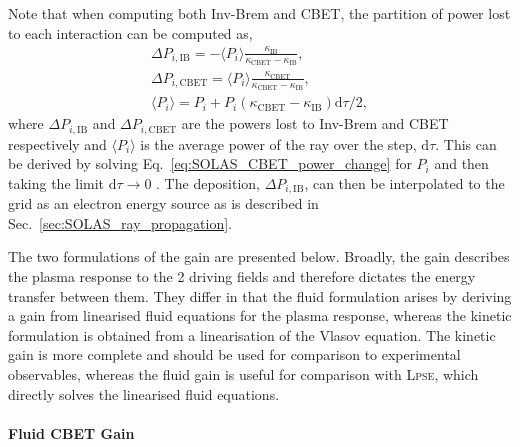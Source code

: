 Note that when computing both \ac{Inv-Brem} and \ac{CBET}, the partition of power lost to each interaction can be computed as,
\begin{equation}
    \label{eq:CBET_deposition}
    \begin{gathered}
        \Delta P_{i,\text{IB}} = - \langle P_i\rangle \frac{\kappa_{\text{IB}}}{\kappa_{\text{CBET}} - \kappa_{\text{IB}}}, \\
        \Delta P_{i,\text{CBET}} = \langle P_i\rangle \frac{\kappa_{\text{CBET}}}{\kappa_{\text{CBET}} - \kappa_{\text{IB}}}, \\
        \langle P_i\rangle = P_i  + P_i\left( \kappa_{\text{CBET}} - \kappa_{\text{IB}} \right)\text{d}\tau/2,
    \end{gathered}
\end{equation}
where $\Delta P_{i,\text{IB}}$ and $\Delta P_{i,\text{CBET}}$ are the powers lost to \ac{Inv-Brem} and \ac{CBET} respectively and $\langle P_i\rangle$ is the average power of the ray over the step, $\text{d}\tau$.
This can be derived by solving Eq.~\ref{eq:SOLAS_CBET_power_change} for $P_i$ and then taking the limit $\text{d}\tau\rightarrow0$ \cite{marozas_wavelength-detuning_2018}.
The deposition, $\Delta P_{i,\text{IB}}$, can then be interpolated to the grid as an electron energy source as is described in Sec.~\ref{sec:SOLAS_ray_propagation}.

The two formulations of the gain are presented below.
Broadly, the gain describes the plasma response to the 2 driving fields and therefore dictates the energy transfer between them.
They differ in that the fluid formulation arises by deriving a gain from linearised fluid equations for the plasma response, whereas the kinetic formulation is obtained from a linearisation of the Vlasov equation.
The kinetic gain is more complete and should be used for comparison to experimental observables, whereas the fluid gain is useful for comparison with \textsc{Lpse}, which directly solves the linearised fluid equations.

\paragraph*{Fluid CBET Gain}

